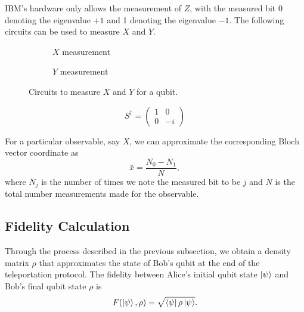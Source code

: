 \documentclass[prx,twocolumn]{revtex4-2}
\numberwithin{equation}{section}
\numberwithin{figure}{section}
\numberwithin{table}{section}
\begin{document}
IBM's hardware only allows the measurement of $Z$, with the measured bit 0 denoting the eigenvalue $+1$ 
and 1 denoting the eigenvalue $-1$. The following circuits can be used to measure $X$ and $Y$.
\begin{figure}[h]
    \centering
    \begin{subfigure}[b]{0.4\columnwidth}
        \caption{$X$ measurement}
    \end{subfigure}
    \begin{subfigure}[b]{0.4\columnwidth}
        \caption{$Y$ measurement}
    \end{subfigure}
    \caption{Circuits to measure $X$ and $Y$ for a qubit.}
\end{figure}

\begin{equation}
    S^\dagger = \begin{pmatrix}
        1 & 0 \\ 
        0 & -i
    \end{pmatrix}
\end{equation}

For a particular observable, say $X$, we can approximate the corresponding Bloch vector coordinate as 
\begin{equation}
    \bar{x} = \frac{N_0 - N_1}{N},
\end{equation}
where $N_j$ is the number of times we note the measured bit to be $j$ and $N$ is the total number measurements 
made for the observable.

\subsection{Fidelity Calculation}
Through the process described in the previous subsection, we obtain a density matrix $\rho$ that approximates 
the state of Bob's qubit at the end of the teleportation protocol. 
The fidelity between Alice's initial qubit state $\ket\psi$ and Bob's final qubit state $\rho$ is 
\cite{nielsen-chuang}
\begin{equation}
    F(\ket\psi, \rho) = \sqrt{\bra\psi \rho \ket\psi}.
    \label{eq:fidelity}
\end{equation}
\end{document}
